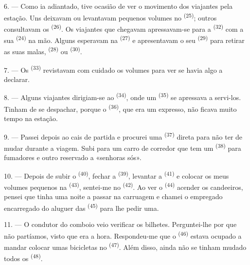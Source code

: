 6. --- Como ia adiantado, tive ocasião de ver o movimento dos viajantes
pela estação. Uns deixavam ou levantavam pequenos volumes no
 \textsuperscript{(25)}; outros consultavam os 
\textsuperscript{(26)}. Os viajantes que chegavam apressavam-se para a
 \textsuperscript{(32)} com a sua  \textsuperscript{(24)} na
mão. Alguns esperavam na  \textsuperscript{(27)} e
apresentavam o seu  \textsuperscript{(29)} para retirar as suas malas,
 \textsuperscript{(28)} ou  \textsuperscript{(30)}.

7. --- Os  \textsuperscript{(33)} revistavam com cuidado
os volumes para ver se havia algo a declarar.

8. --- Alguns viajantes dirigiam-se ao 
\textsuperscript{(34)}, onde um  \textsuperscript{(35)} se apressava a
servi-los. Tinham de se despachar, porque o 
\textsuperscript{(36)}, que era um expresso, não ficava muito tempo na estação.

9. --- Passei depois ao cais de partida e procurei uma 
\textsuperscript{(37)} direta para não ter de mudar durante a viagem. Subi para
um carro de corredor que tem um  \textsuperscript{(38)} para
fumadores e outro reservado a «senhoras sós».

\VUsaut{3.0mm}

10. --- Depois de subir o  \textsuperscript{(40)}, fechar a
 \textsuperscript{(39)}, levantar a 
\textsuperscript{(41)} e colocar os meus volumes pequenos na 
\textsuperscript{(43)}, sentei-me no  \textsuperscript{(42)}. Ao ver o
 \textsuperscript{(44)} acender os candeeiros, pensei que tinha
uma noite a passar na carruagem e chamei o empregado encarregado do
aluguer das  \textsuperscript{(45)} para lhe pedir uma.

11. --- O condutor do comboio veio verificar os bilhetes. Perguntei-lhe
por que não partíamos, visto que era a hora. Respondeu-me que o
 \textsuperscript{(46)} estava ocupado a mandar colocar
umas bicicletas no  \textsuperscript{(47)}. Além disso, ainda não se
tinham mudado todos os  \textsuperscript{(48)}.


